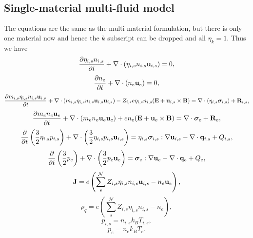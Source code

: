 \documentclass[a4paper,11pt]{report}
\begin{document}
\subsection{Single-material multi-fluid model}
\label{sec:mf_np1fluid_equations}
The equations are the same as the multi-material formulation, but there is only one material now and hence the $k$ subscript can be dropped and all $\eta_k = 1$. Thus we have 
\begin{equation}
    \label{eq:mf_np1fluid_ni}
    \frac{\partial \eta_{i,s} n_{i,s}}{\partial t} + \nabla \cdot \left ( \eta_{i,s} n_{i,s} \mathbf{u}_{i,s} \right ) = 0,
\end{equation}
\begin{equation}
    \label{eq:mf_np1fluid_ne}
    \frac{\partial n_e}{\partial t} + \nabla \cdot \left ( n_e \mathbf{u}_e \right ) = 0,
\end{equation}
\begin{equation}
    \label{eq:mf_np1fluid_ui}
    \frac{\partial m_{i,s} \eta_{i,s} n_{i,s} \mathbf{u}_{i,s}}{\partial t} + \nabla \cdot \left( m_{i,s} \eta_{i,s} n_{i,s} \mathbf{u}_{i,s} \mathbf{u}_{i,s} \right) - Z_{i,s} e \eta_{i,s} n_{i,s} ( \mathbf{E} + \mathbf{u}_{i,s} \times \mathbf{B} ) = \nabla \cdot \left( \eta_{i,s} \bm \sigma_{i,s} \right) + \mathbf{R}_{i,s},
\end{equation}
\begin{equation}
    \label{eq:mf_np1fluid_ue}
    \frac{\partial m_e n_e \mathbf{u}_e}{\partial t} + \nabla \cdot \left( m_e n_e \mathbf{u}_e \mathbf{u}_e \right) + e n_e ( \mathbf{E} + \mathbf{u}_e \times \mathbf{B} ) = \nabla \cdot \bm \sigma_e + \mathbf{R}_e,
\end{equation}
\begin{equation}
    \label{eq:mf_np1fluid_iei}
    \frac{\partial}{\partial t} \left ( \frac{3}{2} \eta_{i,s} p_{i,s} \right ) + \nabla \cdot \left ( \frac{3}{2} \eta_{i,s} p_{i,s} \mathbf{u}_{i,s} \right ) = \eta_{i,s} \bm \sigma_{i,s} : \nabla \mathbf{u}_{i,s} - \nabla \cdot \mathbf{q}_{i,s} + Q_{i,s},
\end{equation}
\begin{equation}
    \label{eq:mf_np1fluid_iee}
    \frac{\partial}{\partial t} \left ( \frac{3}{2} p_e \right ) + \nabla \cdot \left ( \frac{3}{2} p_e \mathbf{u}_e \right ) = \bm \sigma_e : \nabla \mathbf{u}_e - \nabla \cdot \mathbf{q}_e + Q_e,
\end{equation}
\begin{equation}
    \label{eq:mf_np1fluid_curr_density}
    \mathbf{J} = e \left(\sum_s^\mathcal{N} Z_{i,s} \eta_{i,s} n_{i,s} \mathbf{u}_{i,s} - n_e \mathbf{u}_e \right),
\end{equation}
\begin{equation}
    \label{eq:mf_np1fluid_mass_density}
    \rho_q = e \left( \sum_s^\mathcal{N} Z_{i,s} \eta_{i,s} n_{i,s} - n_e \right),
\end{equation}
\begin{equation}
    \label{eq:mf_np1fluid_eos_ion}
    p_{i,s} = n_{i,s} k_B T_{i,s},
\end{equation}
\begin{equation}
    \label{eq:mf_np1fluid_eos_elec}
    p_e = n_e k_B T_e.
\end{equation}
\end{document}
